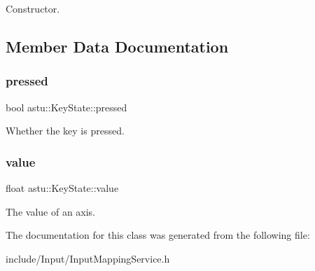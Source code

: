 Constructor. 

\subsection{Member Data Documentation}
\mbox{\label{classastu_1_1KeyState_a3fe7d828adc3d4d652793fc922d8b82b}} 
\subsubsection{\texorpdfstring{pressed}{pressed}}
{\footnotesize\ttfamily bool astu\+::\+Key\+State\+::pressed}

Whether the key is pressed. \mbox{\label{classastu_1_1KeyState_a8a322e8769c1ab8ae657a05839543bac}} 
\subsubsection{\texorpdfstring{value}{value}}
{\footnotesize\ttfamily float astu\+::\+Key\+State\+::value}

The value of an axis. 

The documentation for this class was generated from the following file\+:\begin{DoxyCompactItemize}
\item 
include/\+Input/Input\+Mapping\+Service.\+h\end{DoxyCompactItemize}
